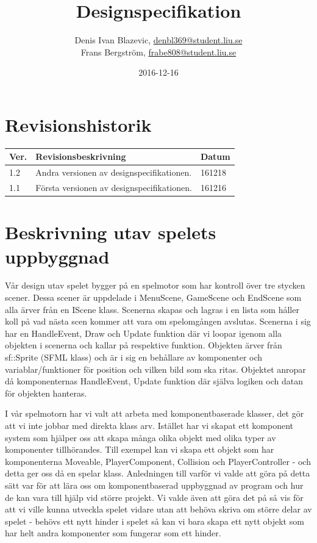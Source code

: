 \documentclass{template}
\author{Denis Ivan Blazevic, \url{denbl369@student.liu.se}\\
  Frans Bergström, \url{frabe808@student.liu.se}\\
    }
\title{Designspecifikation}
\date{2016-12-16}
\begin{document}
\projectpage

\tableofcontents
\newpage

\section{Revisionshistorik}
\begin{table}[!h]
\begin{tabularx}{\linewidth}{|l|X|l|}
\hline
Ver. & Revisionsbeskrivning & Datum \\\hline
1.2 & Andra versionen av designspecifikationen. & 161218 \\\hline
1.1 & Första versionen av designspecifikationen. & 161216 \\\hline
\end{tabularx}
\end{table}

\section{Beskrivning utav spelets uppbyggnad}
Vår design utav spelet bygger på en spelmotor som har kontroll över tre stycken scener. Dessa scener är uppdelade i MenuScene, GameScene och EndScene som alla ärver från en IScene klass. Scenerna skapas och lagras i en lista som håller koll på vad nästa scen kommer att vara om spelomgången avslutas. Scenerna i sig har en HandleEvent, Draw och Update funktion där vi loopar igenom alla objekten i scenerna och kallar på respektive funktion. Objekten ärver från sf::Sprite (SFML klass) och är i sig en behållare av komponenter och variablar/funktioner för position och vilken bild som ska ritas. Objektet anropar då komponenternas HandleEvent, Update funktion där själva logiken och datan för objekten hanteras.

I vår spelmotorn har vi valt att arbeta med komponentbaserade klasser, det gör att vi inte jobbar med direkta klass arv. Istället har vi skapat ett komponent system som hjälper oss att skapa många olika objekt med olika typer av komponenter tillhörandes. Till exempel kan vi skapa ett objekt som har komponenterna Moveable, PlayerComponent, Collision och PlayerController - och detta ger oss då en spelar klass. Anledningen till varför vi valde att göra på detta sätt var för att lära oss om komponentbaserad uppbyggnad av program och hur de kan vara till hjälp vid större projekt. Vi valde även att göra det på så vis för att vi ville kunna utveckla spelet vidare utan att behöva skriva om större delar av spelet - behövs ett nytt hinder i spelet så kan vi bara skapa ett nytt objekt som har helt andra komponenter som fungerar som ett hinder.
\end{document}
